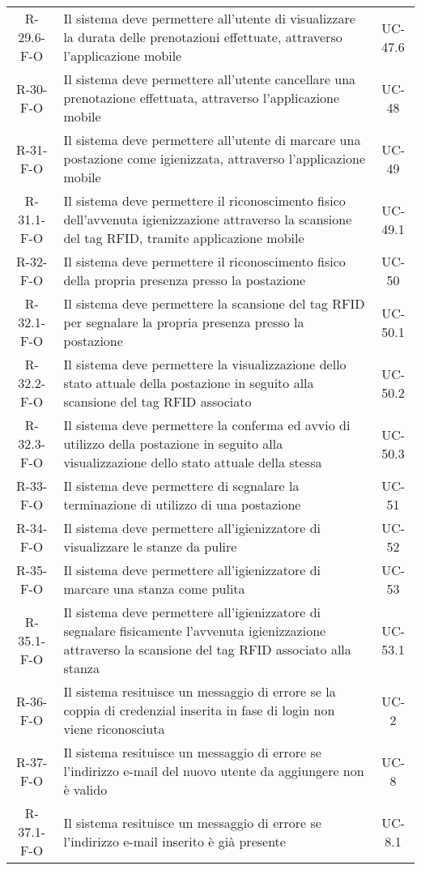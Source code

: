 \begin{longtable}{ c C{9.5cm} c }
    R-29.6-F-O & Il sistema deve permettere all'utente di visualizzare la durata delle prenotazioni effettuate, attraverso l'applicazione mobile& UC-47.6\\
    R-30-F-O & Il sistema deve permettere all'utente cancellare una prenotazione effettuata, attraverso l'applicazione mobile& UC-48\\
    R-31-F-O & Il sistema deve permettere all'utente di marcare una postazione come igienizzata, attraverso l'applicazione mobile& UC-49\\
    R-31.1-F-O & Il sistema deve permettere il riconoscimento fisico dell'avvenuta igienizzazione attraverso la scansione del tag RFID, tramite applicazione mobile& UC-49.1\\
    R-32-F-O & Il sistema deve permettere il riconoscimento fisico della propria presenza presso la postazione& UC-50\\
    R-32.1-F-O & Il sistema deve permettere la scansione del tag RFID per segnalare la propria presenza presso la postazione& UC-50.1\\
    R-32.2-F-O & Il sistema deve permettere la visualizzazione dello stato attuale della postazione in seguito alla scansione del tag RFID associato& UC-50.2\\
    R-32.3-F-O & Il sistema deve permettere la conferma ed avvio di utilizzo della postazione in seguito alla visualizzazione dello stato attuale della stessa& UC-50.3\\
    R-33-F-O & Il sistema deve permettere di segnalare la terminazione di utilizzo di una postazione& UC-51\\
    R-34-F-O & Il sistema deve permettere all'igienizzatore di visualizzare le stanze da pulire& UC-52\\
    R-35-F-O & Il sistema deve permettere all'igienizzatore di marcare una stanza come pulita& UC-53\\
    R-35.1-F-O & Il sistema deve permettere all'igienizzatore di segnalare fisicamente l'avvenuta igienizzazione attraverso la scansione del tag RFID associato alla stanza& UC-53.1\\
    R-36-F-O & Il sistema resituisce un messaggio di errore se la coppia di credenzial inserita in fase di  login non viene riconosciuta& UC-2\\
    R-37-F-O & Il sistema resituisce un messaggio di errore se l'indirizzo e-mail del nuovo utente da aggiungere non è valido& UC-8\\
    R-37.1-F-O & Il sistema resituisce un messaggio di errore se l'indirizzo e-mail inserito è già presente& UC-8.1\\

\end{longtable}
